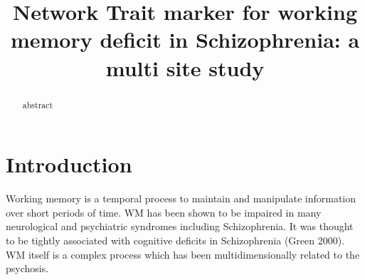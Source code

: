 \documentclass[preprint,authoryear,review,12pt]{elsarticle}
\begin{document}
\begin{frontmatter}

\title{Network Trait marker for working memory deficit in Schizophrenia: a multi site study
}



%






\begin{abstract} 
abstract
\end{abstract}

\begin{keyword}
\end{keyword}

\end{frontmatter}
%
%
\newpage





\section*{Introduction}

Working memory is a temporal process to maintain and manipulate information over short periods of time. WM has been shown to be impaired in many neurological and psychiatric syndromes including Schizophrenia. It was thought to be tightly associated with cognitive deficits in Schizophrenia (Green 2000). WM itself is a complex process which has been multidimensionally related to the psychosis.
\end{document}

